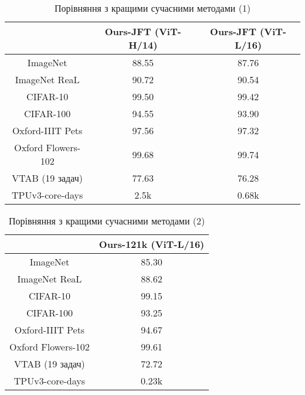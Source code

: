 \begin{table}[H]
    \caption{Порівняння з кращими сучасними методами (1)}
    \begin{tabular}{ c c c }
        \hline
         & Ours-JFT (ViT-H/14) & Ours-JFT (ViT-L/16)  \\ \hline
        ImageNet           & 88.55 & 87.76  \\ 
        ImageNet ReaL      & 90.72 & 90.54   \\ 
        CIFAR-10           & 99.50 & 99.42  \\ 
        CIFAR-100          & 94.55 & 93.90  \\ 
        Oxford-IIIT Pets   & 97.56 & 97.32  \\ 
        Oxford Flowers-102 & 99.68 & 99.74  \\ 
        VTAB (19 задач)    & 77.63 & 76.28  \\ \hline
        TPUv3-core-days    & 2.5k  &  0.68k \\ \hline
    \end{tabular}
    \label{tab:t2}
\end{table}

\begin{table}[H]
    \caption{Порівняння з кращими сучасними методами (2)}
    \begin{tabular}{ c c }
        \hline
         & Ours-121k (ViT-L/16)  \\ \hline
        ImageNet           & 85.30   \\ 
        ImageNet ReaL      & 88.62   \\ 
        CIFAR-10           & 99.15   \\ 
        CIFAR-100          & 93.25   \\ 
        Oxford-IIIT Pets   & 94.67   \\ 
        Oxford Flowers-102 & 99.61   \\ 
        VTAB (19 задач)    & 72.72   \\ \hline
        TPUv3-core-days    & 0.23k  \\ \hline
    \end{tabular}
    \label{tab:t3}
\end{table}

